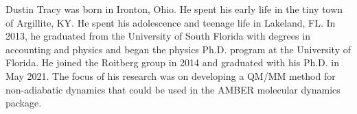 Dustin Tracy was born in Ironton, Ohio.
He spent his early life in the tiny town of Argillite, KY.
He spent his adolescence and teenage life in Lakeland, FL.
In 2013, he graduated from the University of South Florida with degrees in accounting and physics and began the physics Ph.D. program at the University of Florida.
He joined the Roitberg group in 2014 and graduated with his Ph.D. in May 2021. The focus of his research was on developing a QM/MM method for non-adiabatic dynamics that could be used in the AMBER molecular dynamics package.
